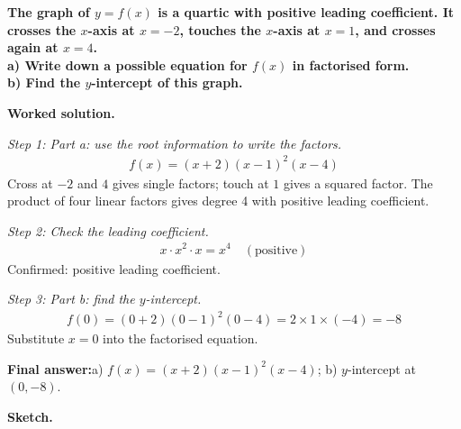 \documentclass[11pt]{article}
\newcommand{\question}[1]{\par\medskip\noindent\textbf{#1}\par}
\begin{document}
\question{The graph of \( y = f(x) \) is a quartic with positive leading coefficient. It crosses the \( x \)-axis at \( x = -2 \), touches the \( x \)-axis at \( x = 1 \), and crosses again at \( x = 4 \). \\[3pt] a) Write down a possible equation for \( f(x) \) in factorised form. \\[3pt] b) Find the \( y \)-intercept of this graph.}

\textbf{Worked solution.}

\textit{Step 1: Part a: use the root information to write the factors.}
\[\begin{gathered}
f(x) = (x + 2)(x - 1)^2(x - 4)
\end{gathered}\]
Cross at \( -2 \) and \( 4 \) gives single factors; touch at \( 1 \) gives a squared factor. The product of four linear factors gives degree 4 with positive leading coefficient.

\textit{Step 2: Check the leading coefficient.}
\[\begin{gathered}
x \cdot x^2 \cdot x = x^4 \quad (\text{positive})
\end{gathered}\]
Confirmed: positive leading coefficient.

\textit{Step 3: Part b: find the \( y \)-intercept.}
\[\begin{gathered}
f(0) = (0+2)(0-1)^2(0-4) = 2 \times 1 \times (-4) = -8
\end{gathered}\]
Substitute \( x = 0 \) into the factorised equation.

\begin{answerbox}
\textbf{Final answer:}\quad a) \(\displaystyle f(x) = (x+2)(x-1)^2(x-4)\); b) \(\displaystyle y\)-intercept at \(\displaystyle (0, -8)\).
\end{answerbox}
\textbf{Sketch.}
\end{document}
